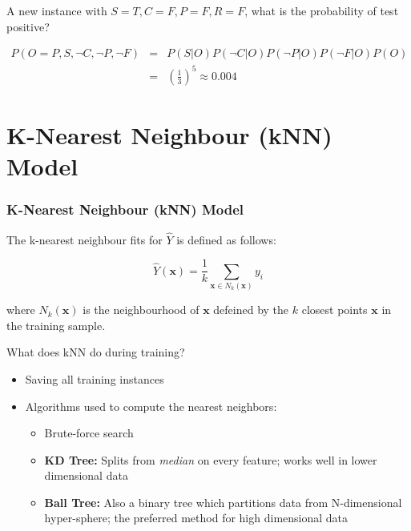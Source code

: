 \documentclass[aspectratio=169, 10pt]{beamer}
\newcommand{\vect}{\mathbf}
\begin{document}
\begin{frame}[t]
    A new instance with $S=T, C=F, P=F, R=F$, what is the probability of test positive?

    \begin{equation*}
        \begin{array} {rcl}
            P(O=P,S, \neg C, \neg P , \neg F) & = & P(S|O)P(\neg C|O)P(\neg P |O)P(\neg F |O)P(O) \\
            & = & (\frac{1}{3})^5 \approx 0.004
        \end{array}
    \end{equation*}

\end{frame}

\section{K-Nearest Neighbour (kNN) Model}
\begin{frame}[t]
    \frametitle{K-Nearest Neighbour (kNN) Model}

    The k-nearest neighbour fits for $\hat{Y}$ is defined as follows:

    \begin{equation*}
        \hat{Y}(\vect{x}) = \frac{1}{k} \sum_{\vect{x} \in N_k (\vect{x})} y_i
    \end{equation*}

    where $N_k (\vect{x})$ is the neighbourhood of $\vect{x}$ defeined by the $k$ closest 
    points $\vect{x}$ in the training sample.

    \vspace{1em}
    What does kNN do during training?
    \pause
    \begin{itemize}
        \item Saving all training instances
        \item Algorithms used to compute the nearest neighbors:
            \begin{itemize}
                \item Brute-force search
                \item \textbf{KD Tree:} Splits from \textit{median} on every feature; works well in lower dimensional data
                \item \textbf{Ball Tree:} Also a binary tree which partitions data from N-dimensional hyper-sphere; the preferred method for high dimensional data
            \end{itemize}
    \end{itemize}

\end{frame}
\end{document}
